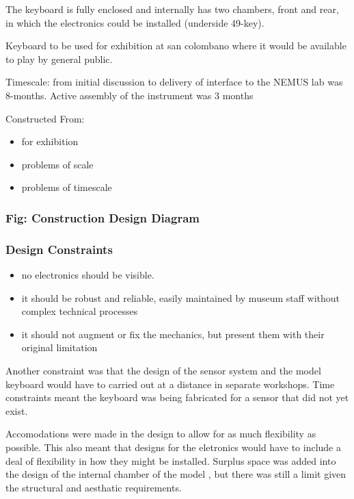 The keyboard is fully enclosed and internally has two chambers, front
and rear, in which the electronics could be installed \figure(underside
49-key).

Keyboard to be used for exhibition at san colombano where it would be
available to play by general public.

Timescale: from initial discussion to delivery of interface to the NEMUS
lab was 8-months. Active assembly of the instrument was 3 months

Constructed From:

\begin{itemize}
\tightlist
\item
  for exhibition
\item
  problems of scale
\item
  problems of timescale
\end{itemize}

\subsubsection{Fig: Construction Design
Diagram}\label{fig-construction-design-diagram-1}

\subsubsection{Design Constraints}\label{design-constraints}

\begin{itemize}
\tightlist
\item
  no electronics should be visible.
\item
  it should be robust and reliable, easily maintained by museum staff
  without complex technical processes
\item
  it should not augment or fix the mechanics, but present them with
  their original limitation
\end{itemize}

Another constraint was that the design of the sensor system and the
model keyboard would have to carried out at a distance in separate
workshops. Time constraints meant the keyboard was being fabricated for
a sensor that did not yet exist.

Accomodations were made in the design to allow for as much flexibility
as possible. This also meant that designs for the eletronics would have
to include a deal of flexibility in how they might be installed. Surplus
space was added into the design of the internal chamber of the model
\FIGURE, but there was still a limit given the structural and aesthatic
requirements.

